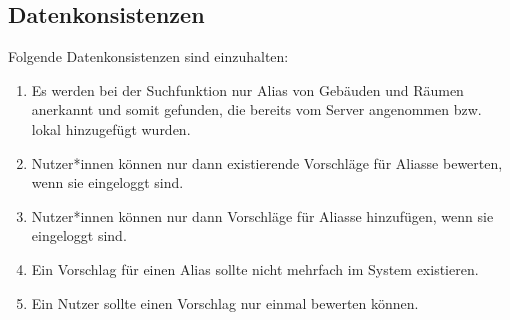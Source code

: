 \subsection{Datenkonsistenzen}

Folgende Datenkonsistenzen sind einzuhalten:
\begin{enumerate}[label=\textbf{/T\arabic*0/}, align=left, resume]
	\item Es werden bei der Suchfunktion nur Alias von Gebäuden und Räumen anerkannt und somit gefunden, die bereits vom Server angenommen bzw. lokal hinzugefügt wurden.
	\item Nutzer*innen können nur dann existierende Vorschläge für Aliasse bewerten, wenn sie eingeloggt sind.
	\item Nutzer*innen können nur dann Vorschläge für Aliasse hinzufügen, wenn sie eingeloggt sind.
	\item Ein Vorschlag für einen Alias sollte nicht mehrfach im System existieren.
	\item Ein Nutzer sollte einen Vorschlag nur einmal bewerten können.

\end{enumerate}